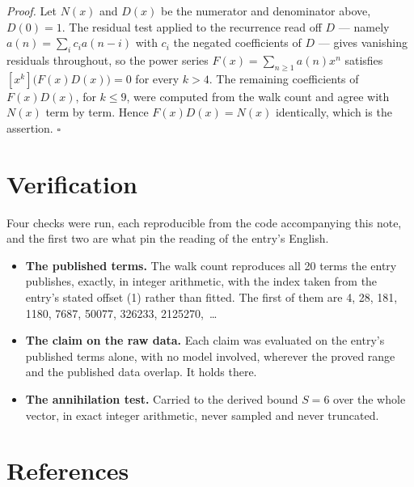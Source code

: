 \documentclass[11pt]{article}
\theoremstyle{definition}
\begin{document}
{\itshape Proof.} Let $N(x)$ and $D(x)$ be the numerator and denominator above, $D(0)=1$. The residual test applied to the recurrence read off $D$ --- namely $a(n) = \sum_i c_i a(n-i)$ with $c_i$ the negated coefficients of $D$ --- gives vanishing residuals throughout, so the power series $F(x)=\sum_{n\ge 1}a(n)x^n$ satisfies $[x^k]\bigl(F(x)D(x)\bigr) = 0$ for every $k > 4$. The remaining coefficients of $F(x)D(x)$, for $k \le 9$, were computed from the walk count and agree with $N(x)$ term by term. Hence $F(x)D(x) = N(x)$ identically, which is the assertion. $\square$

\section{Verification}

Four checks were run, each reproducible from the code accompanying this note, and the first two are what pin the reading of the entry's English.

\begin{itemize}

\item {\bfseries The published terms.} The walk count reproduces all 20 terms the entry publishes, exactly, in integer arithmetic, with the index taken from the entry's stated offset (1) rather than fitted. The first of them are 4, 28, 181, 1180, 7687, 50077, 326233, 2125270,~\dots

\item {\bfseries The claim on the raw data.} Each claim was evaluated on the entry's published terms alone, with no model involved, wherever the proved range and the published data overlap. It holds there.

\item {\bfseries The annihilation test.} Carried to the derived bound $S = 6$ over the whole vector, in exact integer arithmetic, never sampled and never truncated.

\end{itemize}

\section{References}
\end{document}
